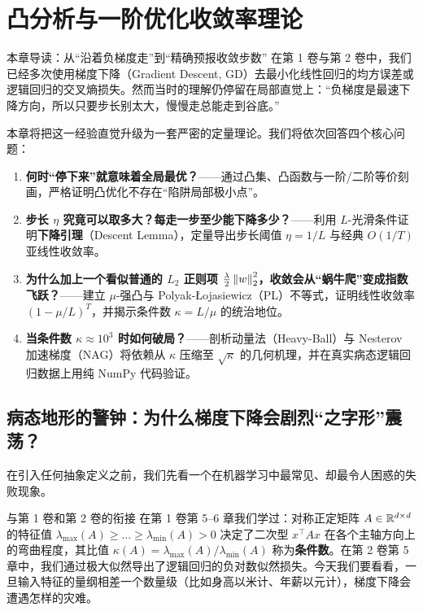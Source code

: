 \chapter[凸分析与一阶优化收敛率]{凸分析与一阶优化收敛率理论}\label{ch:v4-convex}


\begin{chapIntro}{本章导读：从“沿着负梯度走”到“精确预报收敛步数”}
在第 1 卷与第 2 卷中，我们已经多次使用梯度下降（Gradient Descent, GD）去最小化线性回归的均方误差或逻辑回归的交叉熵损失。然而当时的理解仍停留在局部直觉上：“负梯度是最速下降方向，所以只要步长别太大，慢慢走总能走到谷底。”

本章将把这一经验直觉升级为一套严密的定量理论。我们将依次回答四个核心问题：
\begin{enumerate}
  \item \textbf{何时“停下来”就意味着全局最优？}——通过凸集、凸函数与一阶/二阶等价刻画，严格证明凸优化不存在“陷阱局部极小点”。
  \item \textbf{步长 $\eta$ 究竟可以取多大？每走一步至少能下降多少？}——利用 $L$-光滑条件证明\textbf{下降引理}（Descent Lemma），定量导出步长阈值 $\eta = 1/L$ 与经典 $O(1/T)$ 亚线性收敛率。
  \item \textbf{为什么加上一个看似普通的 $L_2$ 正则项 $\frac{\lambda}{2}\left\|w\right\|_2^2$，收敛会从“蜗牛爬”变成指数飞跃？}——建立 $\mu$-强凸与 Polyak-\L{}ojasiewicz（PL）不等式，证明线性收敛率 $(1-\mu/L)^T$，并揭示条件数 $\kappa = L/\mu$ 的统治地位。
  \item \textbf{当条件数 $\kappa \approx 10^3$ 时如何破局？}——剖析动量法（Heavy-Ball）与 Nesterov 加速梯度（NAG）将依赖从 $\kappa$ 压缩至 $\sqrt{\kappa}$ 的几何机理，并在真实病态逻辑回归数据上用纯 NumPy 代码验证。
\end{enumerate}
\end{chapIntro}

\section{病态地形的警钟：为什么梯度下降会剧烈“之字形”震荡？}

在引入任何抽象定义之前，我们先看一个在机器学习中最常见、却最令人困惑的失败现象。

\begin{recallBox}{与第 1 卷和第 2 卷的衔接}
在第 1 卷第 5--6 章我们学过：对称正定矩阵 $A \in \mathbb{R}^{d\times d}$ 的特征值 $\lambda_{\max}(A) \ge \dots \ge \lambda_{\min}(A) > 0$ 决定了二次型 $x^\top A x$ 在各个主轴方向上的弯曲程度，其比值 $\kappa(A) = \lambda_{\max}(A)/\lambda_{\min}(A)$ 称为\textbf{条件数}。在第 2 卷第 5 章中，我们通过极大似然导出了逻辑回归的负对数似然损失。今天我们要看看，一旦输入特征的量纲相差一个数量级（比如身高以米计、年薪以元计），梯度下降会遭遇怎样的灾难。
\end{recallBox}

